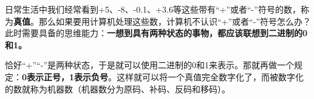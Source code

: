 日常生活中我们经常看到+5、-8、-0.1、+3.6等这些带有``+''或者``-''符号的数，称为{\textbf{真值}}。那么如果要用计算机处理这些数，计算机不认识``+''或者``-''符号怎么办？此时需要具备的思维能力：\textbf{一想到具有两种状态的事物，都应该联想到二进制的0和1。}

恰好``+''``-''是两种状态，于是就可以使用二进制的0和1来表示。那就再做一个规定：\textbf{0表示正号，1表示负号}。这样就可以将一个真值完全数字化了，而被数字化的数就称为机器数（机器数分为原码、补码、反码和移码）。
